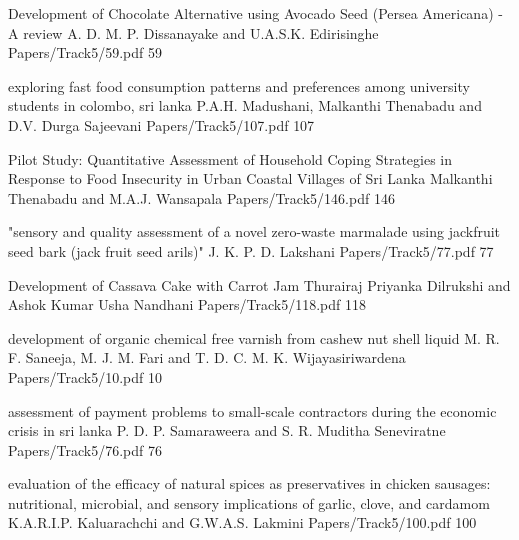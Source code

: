         \addpaper
    	{Development of Chocolate Alternative using Avocado Seed (Persea Americana) - A review}
   		 {A. D. M. P. Dissanayake and U.A.S.K. Edirisinghe} 
   		 {Papers/Track5/59.pdf}
        {59}



        \addpaper
    	{exploring fast food consumption patterns and preferences among university students in colombo, sri lanka}
   		 {P.A.H. Madushani, Malkanthi Thenabadu and D.V. Durga Sajeevani} 
   		 {Papers/Track5/107.pdf}
        {107}

        \addpaper
    	{Pilot Study: Quantitative Assessment of Household Coping Strategies in Response to Food Insecurity in Urban Coastal Villages of Sri Lanka}
   		 {Malkanthi Thenabadu and M.A.J. Wansapala} 
   		 {Papers/Track5/146.pdf}
        {146}

        \addpaper
    	{"sensory and quality assessment of a novel zero-waste marmalade using jackfruit seed bark (jack fruit seed arils)"}
   		 {J. K. P. D. Lakshani} 
   		 {Papers/Track5/77.pdf}
        {77}

        \addpaper
    	{Development of Cassava Cake with Carrot Jam}
   		 {Thurairaj Priyanka Dilrukshi and Ashok Kumar Usha Nandhani} 
   		 {Papers/Track5/118.pdf}
        {118}


        \addpaper
    	{development of organic chemical free varnish from cashew nut shell liquid}
   		 {M. R. F. Saneeja, M. J. M. Fari and T. D. C. M. K. Wijayasiriwardena} 
   		 {Papers/Track5/10.pdf}
        {10}

         \addpaper
    	{assessment of payment problems to small-scale contractors during the economic crisis in sri lanka}
   		 {P. D. P. Samaraweera and S. R. Muditha Seneviratne} 
   		 {Papers/Track5/76.pdf}
        {76}


        \addpaper
{evaluation of the efficacy of natural spices as preservatives in chicken sausages: nutritional, microbial, and sensory implications of garlic, clove, and cardamom}
{K.A.R.I.P. Kaluarachchi and G.W.A.S. Lakmini}
{Papers/Track5/100.pdf}
{100}